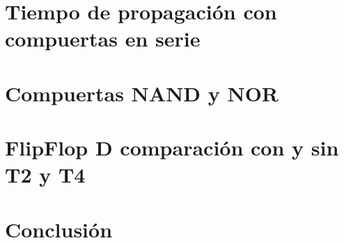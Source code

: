 \documentclass[11pt]{article}
\begin{document}
\section{Tiempo de propagación con compuertas en serie}


\section{Compuertas NAND y NOR}


\section{FlipFlop D comparación con y sin T2 y T4}


\section{Conclusión}


%


%
\end{document}
